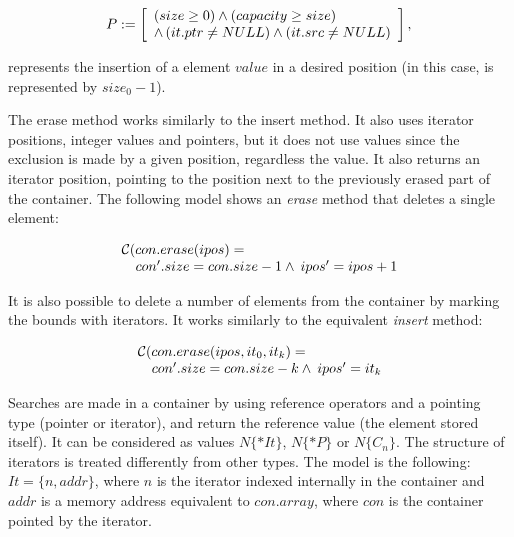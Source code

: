 \documentclass[conference]{IEEEtran}
\begin{document}
{\begin{equation}
\label{insertion-formula-P}
P := \left [ \begin{array}{ll}
     \left( size \geq 0 \right) \wedge \left( capacity \geq size \right) \\
     \wedge \left( it.ptr \neq NULL \right) \wedge \left( it.src \neq NULL \right)\\
              \end{array} \right ],  \\
\end{equation}

represents the insertion of a element $value$ in a desired position (in this case, is represented by $size_{0} - 1$).
}


The erase method works similarly to the insert method. It also uses iterator
positions, integer values and pointers, but it does not use values since the exclusion
is made by a given position, regardless the value. It also returns an iterator position,
pointing to the position next to the previously erased part of the container.
The following model shows an \textit{erase} method that deletes a single element:

\[\begin{array}{ll}
\multicolumn{2}{l}{{\cal C}(con.erase(ipos)=}\\
  & con'.size = con.size - 1 \wedge \: ipos' = ipos + 1 
\end{array}\]

It is also possible to delete a number of elements from the container by
marking the bounds with iterators. It works similarly to the equivalent
\textit{insert} method:

\[\begin{array}{ll}
\multicolumn{2}{l}{{\cal C}(con.erase(ipos, it_0, it_k)=}\\
  & 	con'.size = con.size - k \wedge \: ipos' = it_k 
\end{array}\]

Searches are made in a container by using reference operators
and a pointing type (pointer or iterator), and return the reference
value (the element stored itself). It can be considered as values
$N\{*It\}$, $N\{*P\}$ or $N\{C_n\}$.	The structure of iterators
is treated differently from other types. The model is the following:
$It = \{n, addr\}$,
where $n$ is the iterator indexed
internally in the container and $addr$ is a memory
address equivalent to $con.array$, where $con$ is the container
pointed by the iterator.
\end{document}
